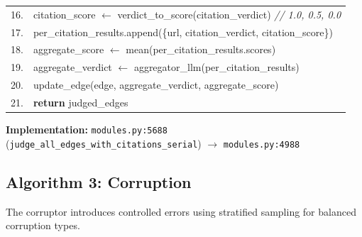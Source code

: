 \begin{table}[H]
\begin{tabular}{@{}r l@{}}
16. & \quad\quad citation\_score $\leftarrow$ verdict\_to\_score(citation\_verdict) \hfill\textit{// 1.0, 0.5, 0.0} \\
17. & \quad\quad per\_citation\_results.append(\{url, citation\_verdict, citation\_score\}) \\
18. & \quad aggregate\_score $\leftarrow$ mean(per\_citation\_results.scores) \\
19. & \quad aggregate\_verdict $\leftarrow$ aggregator\_llm(per\_citation\_results) \\
20. & \quad update\_edge(edge, aggregate\_verdict, aggregate\_score) \\
21. & \textbf{return} judged\_edges \\
\bottomrule
\end{tabular}
\end{table}

\textbf{Implementation:} \texttt{modules.py:5688} (\texttt{judge\_all\_edges\_with\_citations\_serial}) $\rightarrow$ \texttt{modules.py:4988}

\subsection{Algorithm 3: Corruption}
\label{alg:corruption}

The corruptor introduces controlled errors using stratified sampling for balanced corruption types.

